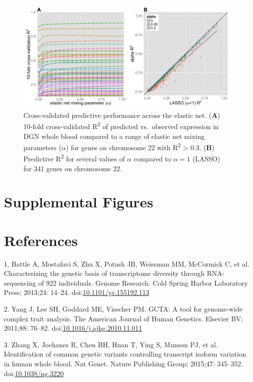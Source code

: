 \documentclass[]{article}
\begin{document}
\begin{figure}[htbp]
\centering
\includegraphics{GenArch_manuscript_files/figure-latex/EN-1.pdf}
\caption{Cross-validated predictive performance across the elastic net.
(\textbf{A}) 10-fold cross-validated R\textsuperscript{2} of predicted
vs.~observed expression in DGN whole blood compared to a range of
elastic net mixing parameters (\(\alpha\)) for genes on chromosome 22
with R\textsuperscript{2} \textgreater{} 0.3. (\textbf{B}) Predictive
R\textsuperscript{2} for several values of \(\alpha\) compared to
\(\alpha = 1\) (LASSO) for 341 genes on chromosome 22.}
\end{figure}

\section{Supplemental Figures}\label{supplemental-figures}

\section*{References}\label{references}

1. Battle A, Mostafavi S, Zhu X, Potash JB, Weissman MM, McCormick C, et
al. Characterizing the genetic basis of transcriptome diversity through
RNA-sequencing of 922 individuals. Genome Research. Cold Spring Harbor
Laboratory Press; 2013;24: 14--24.
doi:\href{http://dx.doi.org/10.1101/gr.155192.113}{10.1101/gr.155192.113}

2. Yang J, Lee SH, Goddard ME, Visscher PM. GCTA: A tool for genome-wide
complex trait analysis. The American Journal of Human Genetics. Elsevier
BV; 2011;88: 76--82.
doi:\href{http://dx.doi.org/10.1016/j.ajhg.2010.11.011}{10.1016/j.ajhg.2010.11.011}

3. Zhang X, Joehanes R, Chen BH, Huan T, Ying S, Munson PJ, et al.
Identification of common genetic variants controlling transcript isoform
variation in human whole blood. Nat Genet. Nature Publishing Group;
2015;47: 345--352.
doi:\href{http://dx.doi.org/10.1038/ng.3220}{10.1038/ng.3220}
\end{document}
